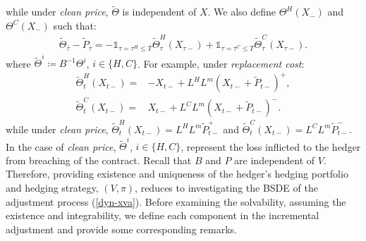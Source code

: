 \documentclass[a4paper, 11pt]{article}              %
\numberwithin{equation}{section}
\theoremstyle{plain}
\newcommand{\btau}{\bar{\tau}}
\newcommand{\1}{\mathds{1}}
\newcommand{\pt}{\tilde{P}}
\newcommand{\Jt}{\tilde{\Theta}}
\theoremstyle{plain}
\theoremstyle{definition}
\theoremstyle{plain}
\begin{document}
while under \textit{clean price}, $\Jt$ is independent of $X$. 
We also define $\Theta^H(X_-)$ and  $\Theta^C(X_-)$ such  that: 
\begin{align}
  \Jt_{\btau} - \pt_{\btau} =
  -\1_{\tau =\tau^H \leq T}\Jt^H_\tau(X_{\tau-}) + \1_{\tau =\tau^C \leq  T}\Jt^C_\tau(X_{\tau-}). \nonumber 
\end{align}
where $\Jt^i \coloneqq B^{-1}\Theta^i$, $i \in \{H, C\}$. 
For example, under \textit{replacement cost}:
\begin{align}
 \Jt^H_t(X_{t-})=&-X_{t-} +L^HL^m(X_{t-} + \pt_{t-})^+, \label{def:JH}\\
 \Jt^C_t(X_{t-})=&X_{t-} +L^CL^m(X_{t-} + \pt_{t-})^-. 
\end{align}
while under \textit{clean price}, $\Jt^H_t(X_{t-})=L^HL^m\pt_{t-}^+$ and
$\Jt^C_t(X_{t-})=L^CL^m\pt_{t-}^-$.  In the case of \textit{clean price},
$\Jt^i$, $i \in \{H, C\}$, represent the loss inflicted to the hedger from breaching
of the contract.  Recall that $B$ and $P$ are independent
of $V$. Therefore, providing existence and uniqueness of the hedger's
hedging portfolio and hedging strategy, $(V, \pi)$, reduces to investigating the
BSDE of the adjustment process (\ref{dyn-xva}). Before examining the
solvability, assuming the existence and integrability, we define each component
in the incremental adjustment and provide some corresponding remarks.
\end{document}
